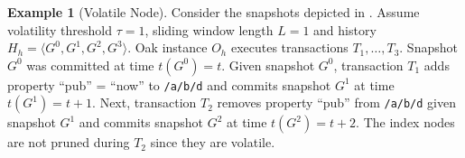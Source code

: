 \message{ !name(thesis.tex)}\documentclass[abstracton,12pt]{scrartcl}
\theoremstyle{definition}
\newtheorem{example}{Example}
\begin{document}
\begin{example}[Volatile Node]
  Consider the snapshots depicted in . Assume volatility
  threshold $\tau = 1$, sliding window length $L = 1$ and history $H_h
  = \langle G^0,G^1,G^2,G^3 \rangle$. Oak instance $O_h$ executes transactions
  $T_1, \dots , T_3$. Snapshot $G^0$ was committed at time $t(G^0) =
  t$. Given snapshot $G^0$, transaction $T_1$ adds property ``pub'' = ``now'' to
  \texttt{/a/b/d} and commits snapshot $G^1$ at time $t(G^1) = t + 1$. Next,
  transaction $T_2$ removes property ``pub'' from \texttt{/a/b/d} given snapshot
  $G^1$ and commits snapshot $G^2$ at time $t(G^2) = t + 2$. The index nodes are
  not pruned during $T_2$ since they are volatile.
  \label{ex:volatile_node}
\end{example}
\end{document}
